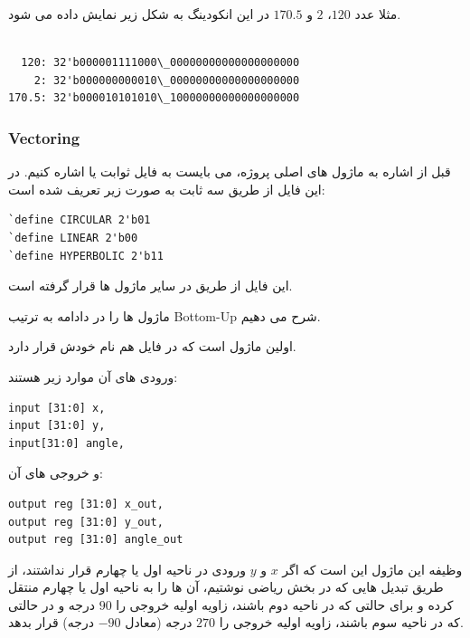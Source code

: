 \documentclass[12pt,titlepage,a4page , tikz , multi,table , svgnames,xcdraw]{article}
\begin{document}
مثلا عدد $120$، $2$ و $170.5$ در این انکودینگ به شکل زیر نمایش داده می شود.
 
 
 \begin{latin}
\begin{verbatim}

  120: 32'b000001111000\_00000000000000000000
    2: 32'b000000000010\_00000000000000000000
170.5: 32'b000010101010\_10000000000000000000
\end{verbatim}
\end{latin} 

 
\subsubsection{Vectoring}

قبل از اشاره به ماژول های اصلی پروژه، می بایست به فایل ثوابت یا  اشاره کنیم. در این فایل از طریق  سه ثابت به صورت زیر تعریف شده است:
\begin{latin}
\begin{verbatim}
`define CIRCULAR 2'b01
`define LINEAR 2'b00
`define HYPERBOLIC 2'b11
\end{verbatim}
\end{latin}

این فایل از طریق  در سایر ماژول ها قرار گرفته است.

ماژول ها را در دادامه به ترتیب Bottom-Up شرح می دهیم.

اولین ماژول  است که در فایل هم نام خودش قرار دارد. 

 ورودی های آن موارد زیر هستند:

\begin{latin}
\begin{verbatim}
input [31:0] x,
input [31:0] y,
input[31:0] angle,
\end{verbatim}
\end{latin}

و خروجی های آن:

\begin{latin}
\begin{verbatim}
output reg [31:0] x_out,
output reg [31:0] y_out,
output reg [31:0] angle_out
\end{verbatim}
\end{latin}

وظیفه این ماژول این است که اگر $x$ و $y$ ورودی در ناحیه اول یا چهارم قرار نداشتند، از طریق تبدیل هایی که در بخش ریاضی نوشتیم، آن ها را به ناحیه اول یا چهارم منتقل کرده و برای حالتی که در ناحیه دوم باشند، زاویه اولیه خروجی را $90$ درجه و در حالتی که در ناحیه سوم باشند، زاویه اولیه خروجی را $270$ درجه (معادل $-90$ درجه) قرار بدهد.
\end{document}
